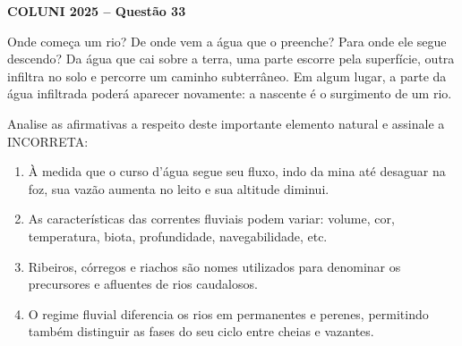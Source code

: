 \textbf{COLUNI 2025 -- Questão 33}\par\medskip Onde começa um rio? De onde vem a água que o preenche? Para onde ele segue descendo? Da água que cai sobre a terra, uma parte escorre pela superfície, outra infiltra no solo e percorre um caminho subterrâneo. Em algum lugar, a parte da água infiltrada poderá aparecer novamente: a nascente é o surgimento de um rio.

\par

Analise as afirmativas a respeito deste importante elemento natural e assinale a INCORRETA:\begin{enumerate}
\item À medida que o curso d’água segue seu fluxo, indo da mina até desaguar na foz, sua vazão aumenta no
      leito e sua altitude diminui.
\item As características das correntes fluviais podem variar: volume, cor, temperatura, biota, profundidade,
      navegabilidade, etc.
\item Ribeiros, córregos e riachos são nomes utilizados para denominar os precursores e afluentes de rios
      caudalosos.
\item O regime fluvial diferencia os rios em permanentes e perenes, permitindo também distinguir as fases do
      seu ciclo entre cheias e vazantes.\end{enumerate}
